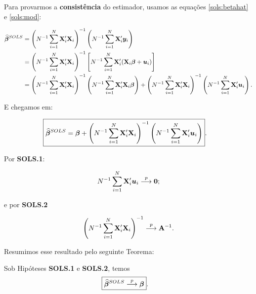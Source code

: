 \documentclass[11pt, oneside, a4paper, article]{article}
\numberwithin{equation}{section}
\begin{document}
Para provarmos a \textbf{consistência} do estimador, usamos as equações \eqref{sols:betahat} e \eqref{sols:mod}:

\vspace{-1 em}
\begin{align*}
\widehat{\boldsymbol{\beta}}^{SOLS} &=
\left( N^{-1}\sum_{i=1}^{N} \mathbf{X}_{i}' \mathbf{X}_{i}   \right)^{-1}
\left( N^{-1}\sum_{i=1}^{N} \mathbf{X}_{i}' \boldsymbol{y}_{i}   \right)
\\ &=
\left( N^{-1}\sum_{i=1}^{N} \mathbf{X}_{i}' \mathbf{X}_{i}   \right)^{-1}
\left[ N^{-1}\sum_{i=1}^{N} \mathbf{X}_{i}' (\mathbf{X}_{i} \boldsymbol{\beta} + \boldsymbol{u}_{i})   \right]
\\ &=
\left( N^{-1}\sum_{i=1}^{N} \mathbf{X}_{i}' \mathbf{X}_{i}   \right)^{-1}
\left( N^{-1}\sum_{i=1}^{N} \mathbf{X}_{i}' \mathbf{X}_{i} \boldsymbol{\beta}    \right)
+
\left( N^{-1}\sum_{i=1}^{N} \mathbf{X}_{i}' \mathbf{X}_{i}   \right)^{-1}
\left( N^{-1}\sum_{i=1}^{N} \mathbf{X}_{i}' \boldsymbol{u}_{i}   \right).
\end{align*}

\noindent
E chegamos em:

\vspace{-1 em}
\begin{align}\label{sols:betahat:u}
\Aboxed{
\betahatbold^{SOLS} &=
\betavec
+
\left( N^{-1}\sum_{i=1}^{N} \Xmat_{i}' \Xmat_{i}   \right)^{-1}
\left( N^{-1}\sum_{i=1}^{N} \Xmat_{i}' \uvec_{i}   \right)
}.
\end{align}

Por \textbf{SOLS.1}:

\vspace{-1 em}
\begin{align*}
N^{-1} \sum_{i=1}^{N} \mathbf{X}_{i}' \boldsymbol{u}_{i}  \overset{p}{\longrightarrow}  \boldsymbol{0};
\end{align*}

\noindent e por \textbf{SOLS.2}

\vspace{-1 em}
\begin{align*}
\left( N^{-1} \sum_{i=1}^{N} \mathbf{X}_{i}' \mathbf{X}_{i} \right)^{-1}  \overset{p}{\longrightarrow}  \mathbf{A}^{-1}.
\end{align*}

Resumimos esse resultado pelo seguinte Teorema:

\begin{teo}\label{SOLS:const}
Sob Hipóteses \textbf{SOLS.1} e \textbf{SOLS.2}, temos 
\begin{align*}
\Aboxed{
	\betahatbold^{SOLS} \arrowp \betavec
}.
\end{align*}
\end{teo}
\end{document}
